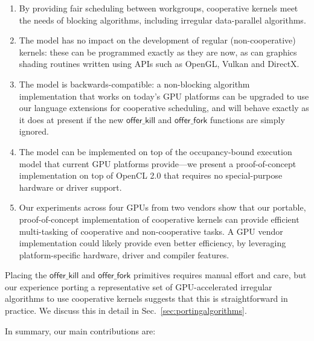 \documentclass[numbers,nocopyrightspace,10pt]{sigplanconf}
\newcommand{\mysec}{Sec.~}
\newcommand{\offerfork}{\mathsf{offer\_fork}}
\newcommand{\offerkill}{\mathsf{offer\_kill}}
\begin{document}
\begin{enumerate}

\item By providing fair scheduling between workgroups, cooperative
  kernels meet the needs of blocking algorithms, including irregular
  data-parallel algorithms.

\item The model has no impact on the development of regular
  (non-cooperative) kernels: these can be programmed exactly as they
  are now, as can graphics shading routines written using APIs such as
  OpenGL, Vulkan and DirectX.

\item The model is backwards-compatible: a non-blocking algorithm
  implementation that works on today's GPU platforms can be upgraded
  to use our language extensions for cooperative scheduling, and will
  behave exactly as it does at present if the new $\offerkill$ and
  $\offerfork$ functions are simply ignored.

\item The model can be implemented on top of the occupancy-bound
  execution model that current GPU platforms provide---we present a
  proof-of-concept implementation on top of OpenCL 2.0 that requires
  no special-purpose hardware or driver support.

\item Our experiments across four GPUs from two vendors show that our
  portable, proof-of-concept implementation of cooperative kernels can
  provide efficient multi-tasking of cooperative and non-cooperative
  tasks.  A GPU vendor implementation could likely provide even better
  efficiency, by leveraging platform-specific hardware, driver and
  compiler features.

\end{enumerate}

Placing the $\offerkill$ and $\offerfork$ primitives requires manual
effort and care, but our experience porting a representative set of
GPU-accelerated irregular algorithms to use cooperative kernels
suggests that this is straightforward in practice.  We discuss this in
detail in \mysec\ref{sec:portingalgorithms}.

In summary, our main contributions are:
\end{document}

